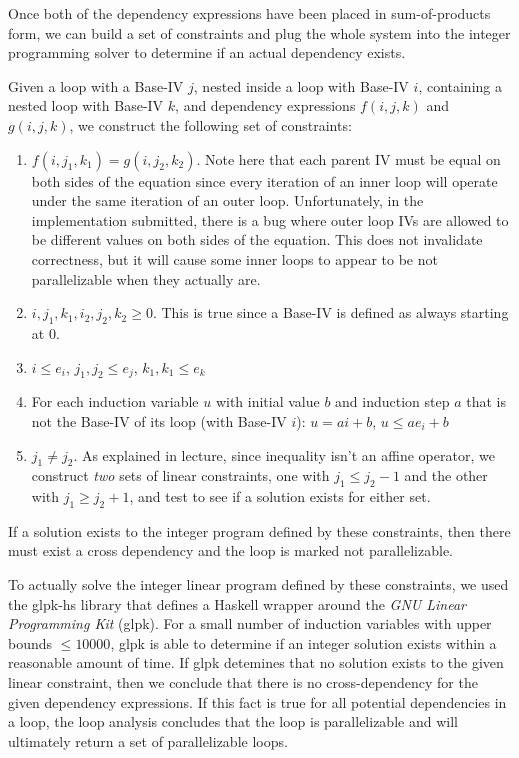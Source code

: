 \documentclass[11pt]{article}
\begin{document}
Once both of the dependency expressions have been placed in
sum-of-products form, we can build a set of constraints and plug the
whole system into the integer programming solver to determine if an
actual dependency exists. 

Given a loop with a Base-IV $j$, nested inside a loop with Base-IV
$i$, containing a nested loop with Base-IV $k$, and dependency
expressions $f(i, j, k)$ and $g(i, j, k)$, we construct the following
set of constraints: 

\begin{enumerate}

\item $f(i, j_1, k_1) = g(i, j_2, k_2)$. Note here that each parent IV
  must be equal on both sides of the equation since every iteration of
  an inner loop will operate under the same iteration of an outer
  loop. Unfortunately, in the implementation submitted, there is a bug
  where outer loop IVs are allowed to be different values on both
  sides of the equation. This does not invalidate correctness, but it
  will cause some inner loops to appear to be not parallelizable when
  they actually are. 

\item $i, j_1, k_1, i_2, j_2, k_2 \geq 0$. This is true since a
  Base-IV is defined as always starting at $0$.

\item $i \leq e_i$, $j_1, j_2 \leq e_j$, $k_1, k_1 \leq e_k$

\item For each induction variable $u$ with initial value $b$ and
  induction step $a$ that is not the Base-IV of its
  loop (with Base-IV $i$): $u = ai + b$, $u \leq ae_i + b$ 

\item $j_1 \neq j_2$. As explained in lecture, since inequality isn't
  an affine operator, we construct \emph{two} sets of linear
  constraints, one with $j_1 \leq j_2-1$ and the other with $j_1 \geq
  j_2 + 1$, and test to see if a solution exists for either set.

\end{enumerate}

If a solution exists to the integer program defined by these
constraints, then there must exist a cross dependency and the loop is
marked not parallelizable. 

To actually solve the integer linear program defined by these
constraints, we used the glpk-hs library that defines a Haskell
wrapper around the \emph{GNU Linear Programming Kit} (glpk). For a
small number of induction variables with upper bounds $\leq 10000$,
glpk is able to determine if an integer solution exists within a
reasonable amount of time. If glpk detemines that no solution exists
to the given linear constraint, then we conclude that there is no
cross-dependency for the given dependency expressions. If this fact is
true for all potential dependencies in a loop, the loop analysis
concludes that the loop is parallelizable and will ultimately return a
set of parallelizable loops.
\end{document}
